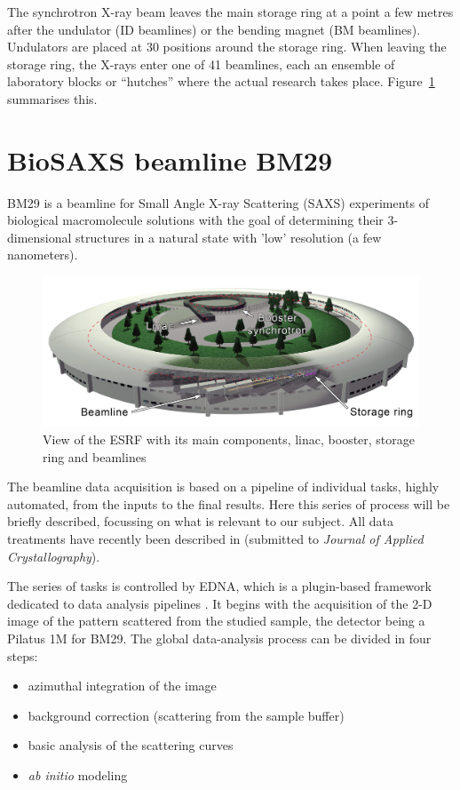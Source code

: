 \documentclass[a4paper, 11pt]{report}
\begin{document}
The synchrotron X-ray beam leaves the main storage ring at a point a 
few metres after the undulator (ID beamlines) or the bending magnet 
(BM beamlines). 
Undulators are placed at 30 positions around the storage ring.
When leaving the storage ring, the X-rays enter one of 41 beamlines, 
each an ensemble of laboratory blocks or “hutches” where the actual 
research takes place. 
Figure~\ref{fgr:synchrotron} summarises this.

\section{BioSAXS beamline BM29}
\label{bm29}
BM29 \cite{BM29paper} is a beamline for Small Angle X-ray Scattering 
(SAXS) experiments of biological macromolecule solutions with the goal 
of determining their 3-dimensional structures in a natural state with 
'low' resolution (a few nanometers). 

\begin{figure}
\centering
\includegraphics[scale=0.22]{synchrotron.png}
\caption{View of the ESRF with its main components, linac, booster, 
    storage ring and beamlines}
\label{fgr:synchrotron}
\end{figure}

The beamline data acquisition is based on a pipeline of individual 
tasks, highly automated, from the inputs to the final results. 
Here this series of process will be briefly described, focussing on 
what is relevant to our subject.
All data treatments have recently been described in \cite{BM29news} 
(submitted to \textit{Journal of Applied Crystallography}).

The series of tasks is controlled by EDNA, which is a plugin-based 
framework dedicated to data analysis pipelines \cite{edna}. 
It begins with the acquisition of the 2-D image of the pattern 
scattered from the studied sample, the detector being a Pilatus 1M for 
BM29. 
The global data-analysis process can be divided in four steps: 
\begin{itemize}
 \item azimuthal integration of the image
 \item background correction (scattering from the sample buffer)
 \item basic analysis of the scattering curves
 \item \textit{ab initio} modeling
\end{itemize}
\end{document}
